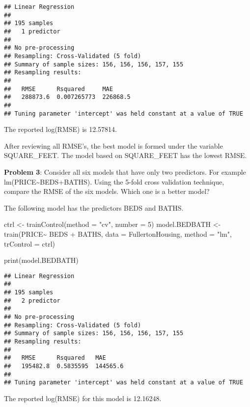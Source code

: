 \documentclass[
]{article}
\newenvironment{Shaded}{\begin{snugshade}}{\end{snugshade}}
\newcommand{\AttributeTok}[1]{\textcolor[rgb]{0.77,0.63,0.00}{#1}}
\newcommand{\DecValTok}[1]{\textcolor[rgb]{0.00,0.00,0.81}{#1}}
\newcommand{\FunctionTok}[1]{\textcolor[rgb]{0.00,0.00,0.00}{#1}}
\newcommand{\NormalTok}[1]{#1}
\newcommand{\OtherTok}[1]{\textcolor[rgb]{0.56,0.35,0.01}{#1}}
\newcommand{\SpecialCharTok}[1]{\textcolor[rgb]{0.00,0.00,0.00}{#1}}
\newcommand{\StringTok}[1]{\textcolor[rgb]{0.31,0.60,0.02}{#1}}
\begin{document}
\begin{verbatim}
## Linear Regression 
## 
## 195 samples
##   1 predictor
## 
## No pre-processing
## Resampling: Cross-Validated (5 fold) 
## Summary of sample sizes: 156, 156, 156, 157, 155 
## Resampling results:
## 
##   RMSE      Rsquared     MAE     
##   288873.6  0.007265773  226868.5
## 
## Tuning parameter 'intercept' was held constant at a value of TRUE
\end{verbatim}

The reported log(RMSE) is 12.57814.

After reviewing all RMSE's, the best model is formed under the variable
SQUARE\_FEET. The model based on SQUARE\_FEET has the lowest RMSE.

\textbf{Problem 3}: Consider all six models that have only two
predictors. For example lm(PRICE\textasciitilde BEDS+BATHS). Using the
5-fold cross validation technique, compare the RMSE of the six models.
Which one is a better model?

The following model has the predictors BEDS and BATHS.

\begin{Shaded}
\begin{Highlighting}[]
\NormalTok{ctrl }\OtherTok{\textless{}{-}} \FunctionTok{trainControl}\NormalTok{(}\AttributeTok{method =} \StringTok{"cv"}\NormalTok{, }\AttributeTok{number =} \DecValTok{5}\NormalTok{)}
\NormalTok{model.BEDBATH }\OtherTok{\textless{}{-}} \FunctionTok{train}\NormalTok{(PRICE}\SpecialCharTok{\textasciitilde{}}\NormalTok{ BEDS }\SpecialCharTok{+}\NormalTok{ BATHS, }
               \AttributeTok{data =}\NormalTok{ FullertonHousing, }\AttributeTok{method =} \StringTok{"lm"}\NormalTok{, }\AttributeTok{trControl =}\NormalTok{ ctrl)}

\FunctionTok{print}\NormalTok{(model.BEDBATH)}
\end{Highlighting}
\end{Shaded}

\begin{verbatim}
## Linear Regression 
## 
## 195 samples
##   2 predictor
## 
## No pre-processing
## Resampling: Cross-Validated (5 fold) 
## Summary of sample sizes: 156, 156, 156, 157, 155 
## Resampling results:
## 
##   RMSE      Rsquared   MAE     
##   195482.8  0.5835595  144565.6
## 
## Tuning parameter 'intercept' was held constant at a value of TRUE
\end{verbatim}

The reported log(RMSE) for this model is 12.16248.
\end{document}

